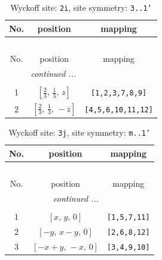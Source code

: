 \documentclass[fleqn,8pt]{jsarticle}
\begin{document}
\renewcommand{\arraystretch}{1.2}
\begin{longtable}{ccc}
\caption{Wyckoff site: {\tt 2i}, site symmetry: {\tt 3..1'}}
 \\
 \hline \hline
No. & position & mapping \\ \hline \endfirsthead

\multicolumn{2}{l}{\tablename\ \thetable{}} \\
 \hline \hline
No. & position & mapping \\ \hline \endhead

 \hline \hline
\multicolumn{2}{r}{\footnotesize\it continued ...} \\ \endfoot

 \hline \hline
\multicolumn{2}{r}{} \\ \endlastfoot

1 & $\left[ \frac{2}{3},\, \frac{1}{3},\, z \right]$ & {\tt [1,2,3,7,8,9]} \\ \hline
2 & $\left[ \frac{2}{3},\, \frac{1}{3},\, - z \right]$ & {\tt [4,5,6,10,11,12]} \\
\end{longtable}
\renewcommand{\arraystretch}{1.2}
\begin{longtable}{ccc}
\caption{Wyckoff site: {\tt 3j}, site symmetry: {\tt m..1'}}
 \\
 \hline \hline
No. & position & mapping \\ \hline \endfirsthead

\multicolumn{2}{l}{\tablename\ \thetable{}} \\
 \hline \hline
No. & position & mapping \\ \hline \endhead

 \hline \hline
\multicolumn{2}{r}{\footnotesize\it continued ...} \\ \endfoot

 \hline \hline
\multicolumn{2}{r}{} \\ \endlastfoot

1 & $\left[ x,\, y,\, 0 \right]$ & {\tt [1,5,7,11]} \\ \hline
2 & $\left[ - y,\, x - y,\, 0 \right]$ & {\tt [2,6,8,12]} \\ \hline
3 & $\left[ - x + y,\, - x,\, 0 \right]$ & {\tt [3,4,9,10]} \\
\end{longtable}
\renewcommand{\arraystretch}{1.2}
\end{document}
